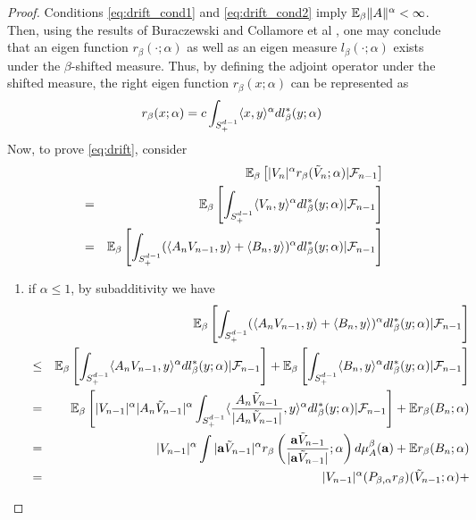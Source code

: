 \documentclass[aoas,preprint]{imsart}
\numberwithin{equation}{section}
\theoremstyle{plain}
\begin{document}
\begin{proof}
  Conditions \eqref{eq:drift_cond1} and \eqref{eq:drift_cond2} imply $\mathbb{E}_\beta
  \|A\|^\alpha < \infty$. Then, using the results of Buraczewski and
  Collamore et al \cite{BCDZ2014}, one may conclude that an eigen
  function $r_\beta(\cdot; \alpha)$ as well as an eigen measure
  $l_\beta(\cdot; \alpha)$ exists under the $\beta$-shifted
  measure. Thus, by defining the adjoint operator under  the shifted
  measure, the right eigen function $r_\beta(x; \alpha)$ can be represented as
  \[
  r_\beta(x; \alpha) = c \int_{S_+^{d-1}} \langle x, y\rangle^\alpha
  dl^*_{\beta}(y; \alpha)
  \]
Now, to prove \eqref{eq:drift}, consider
  \begin{eqnarray}
    && \mathbb{E}_\beta \left[ |V_n|^\alpha r_\beta(\tilde V_n; \alpha) | \mathcal F_{n-1} \right]
    \nonumber \\
    &=& \mathbb{E}_\beta\left[\int_{S_+^{d-1}} \langle V_n, y\rangle^\alpha dl^*_{\beta}(y; \alpha)|
      \mathcal F_{n-1} \right]
    \nonumber \\
    &=& \mathbb{E}_\beta\left[\int_{S_+^{d-1}} (\langle A_n V_{n-1}, y\rangle + \langle B_n,
        y\rangle)^\alpha dl^*_{\beta}(y; \alpha) | \mathcal F_{n-1} \right]
    \label{eq:drift_proof_1}
  \end{eqnarray}
  \begin{enumerate}
  \item if $\alpha \leq 1$, by subadditivity we have
    \begin{eqnarray*}
      &&\E_\beta\left[\int_{S_+^{d-1}} (\inn{A_n V_{n-1}, y} + \inn{B_n,
          y})^\alpha dl^*_{\beta}(y; \alpha) | \mathcal F_{n-1} \right]\\
      &\leq& \E_\beta\left[\int_{S_+^{d-1}} \inn{A_n V_{n-1}, y}^\alpha
        dl^*_{\beta}(y; \alpha) | \mathcal F_{n-1} \right]
      + \E_\beta\left[\int_{S_+^{d-1}} \inn{B_n, y}^\alpha dl^*_{\beta}(y; \alpha) |
        \mathcal F_{n-1} \right] \\
      &=& \E_\beta\left[|V_{n-1}|^\alpha |A_n \tilde V_{n-1}|^\alpha\int_{S_+^{d-1}}
        \inn{ {A_n \tilde V_{n-1} \over |A_n \tilde V_{n-1}|}, y}^\alpha
        dl^*_{\beta}(y; \alpha) | \mathcal F_{n-1} \right]  + \E r_\beta(B_n; \alpha)\\
      &=& |V_{n-1}|^\alpha  \int |\mathbf a \tilde V_{n-1}|^\alpha
      r_\beta\left({\mathbf a \tilde V_{n-1} \over |\mathbf a \tilde V_{n-1}|}; \alpha\right)
      d\mu_A^\beta (\mathbf a) + \E r_\beta(B_n; \alpha) \\
      &=& |V_{n-1}|^\alpha (P_{\beta, \alpha} r_{\beta})(\tilde V_{n-1}; \alpha) +

\end{eqnarray*}
\end{enumerate}
\end{proof}
\end{document}
